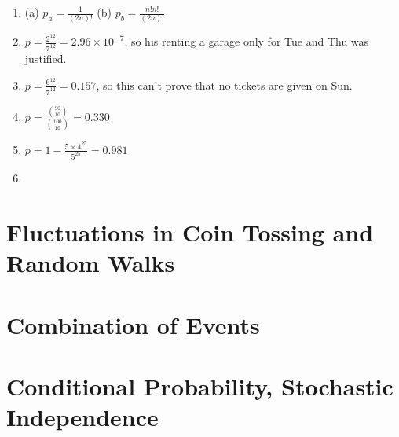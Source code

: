 \documentclass{article}
\numberwithin{equation}{subsection}
\begin{document}
\begin{enumerate}
		\item (a) $p_a = \frac{1}{(2n)!}$  (b) $p_b = \frac{n!n!}{(2n)!}$
		\item $p = \frac{2^{12}}{7^{12}} = 2.96\times10^{-7}$, so his renting a garage only for Tue and Thu was justified.
		\item $p = \frac{6^{12}}{7^{12}} = 0.157$, so this can't prove that no tickets are given on Sun.
		\item $p = \frac{{90 \choose 10}}{{100 \choose 10}} = 0.330$
		\item $p = 1-\frac{5\times4^{25}}{5^{25}} = 0.981$
		\item 
		\end{enumerate}
		\subsubsection{}
		\subsubsection{}
	\newpage
	\section{Fluctuations in Coin Tossing and Random Walks}
			
	\newpage
	\section{Combination of Events}
					
	\newpage
	\section{Conditional Probability, Stochastic Independence}
			
		
\end{document}
